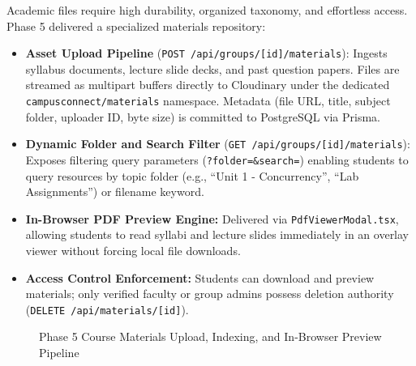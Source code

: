 \documentclass[11pt,a4paper]{report}
\begin{document}
Academic files require high durability, organized taxonomy, and effortless access. Phase 5 delivered a specialized materials repository:

\begin{itemize}
    \item \textbf{Asset Upload Pipeline} (\texttt{POST /api/groups/[id]/materials}): Ingests syllabus documents, lecture slide decks, and past question papers. Files are streamed as multipart buffers directly to Cloudinary under the dedicated \texttt{campusconnect/materials} namespace. Metadata (file URL, title, subject folder, uploader ID, byte size) is committed to PostgreSQL via Prisma.
    \item \textbf{Dynamic Folder and Search Filter} (\texttt{GET /api/groups/[id]/materials}): Exposes filtering query parameters (\texttt{?folder=\&search=}) enabling students to query resources by topic folder (e.g., ``Unit 1 - Concurrency'', ``Lab Assignments'') or filename keyword.
    \item \textbf{In-Browser PDF Preview Engine:} Delivered via \texttt{PdfViewerModal.tsx}, allowing students to read syllabi and lecture slides immediately in an overlay viewer without forcing local file downloads.
    \item \textbf{Access Control Enforcement:} Students can download and preview materials; only verified faculty or group admins possess deletion authority (\texttt{DELETE /api/materials/[id]}).
\end{itemize}

\begin{figure}[htbp]
\centering
{}
\caption{Phase 5 Course Materials Upload, Indexing, and In-Browser Preview Pipeline}
\label{fig:phase5-pipeline}
\end{figure}
\end{document}
